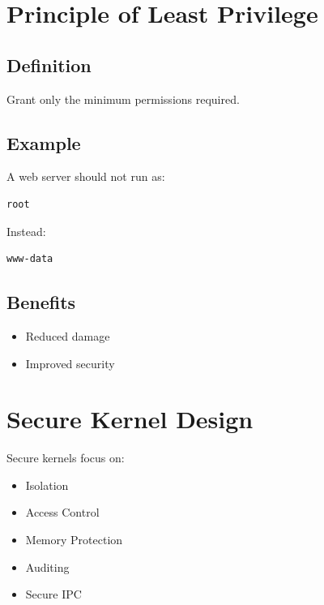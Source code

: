 \section{Principle of Least Privilege}

\subsection{Definition}

Grant only the minimum permissions required.

\subsection{Example}

A web server should not run as:

\begin{verbatim}
root
\end{verbatim}

Instead:

\begin{verbatim}
www-data
\end{verbatim}

\subsection{Benefits}

\begin{itemize}
\item Reduced damage
\item Improved security
\end{itemize}

\section{Secure Kernel Design}

Secure kernels focus on:

\begin{itemize}
\item Isolation
\item Access Control
\item Memory Protection
\item Auditing
\item Secure IPC
\end{itemize}

